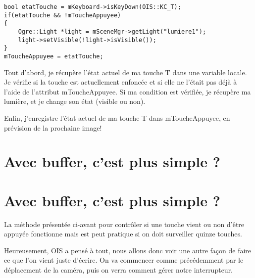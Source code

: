 \documentclass[10pt,a4paper]{report}
\begin{document}
\begin{lstlisting}[caption={Capture de l'\'etat ponctuel d'une touche}]
bool etatTouche = mKeyboard->isKeyDown(OIS::KC_T);
if(etatTouche && !mToucheAppuyee)
{
    Ogre::Light *light = mSceneMgr->getLight("lumiere1");
    light->setVisible(!light->isVisible());
}
mToucheAppuyee = etatTouche;
\end{lstlisting}





Tout d'abord, je r\'ecup\`ere l'\'etat actuel de ma touche T dans une variable locale. Je v\'erifie si la touche est actuellement enfonc\'ee et si elle ne l'\'etait pas d\'ej\`a \`a l'aide de l'attribut mToucheAppuyee. Si ma condition est v\'erifi\'ee, je r\'ecup\`ere ma lumi\`ere, et je change son \'etat (visible ou non).

Enfin, j'enregistre l'\'etat actuel de ma touche T dans mToucheAppuyee, en pr\'evision de la prochaine image!






\section{Avec buffer, c'est plus simple ?}




























\section{Avec buffer, c'est plus simple ?}

La m\'ethode pr\'esent\'ee ci-avant pour contrôler si une touche vient ou non d'\^etre appuy\'ee fonctionne mais est peut pratique si on doit surveiller quinze touches.

Heureusement, OIS a pens\'e \`a tout, nous allons donc voir une autre fa\c{c}on de faire ce que l'on vient juste d'\'ecrire. On va commencer comme pr\'ec\'edemment par le d\'eplacement de la cam\'era, puis on verra comment g\'erer notre interrupteur.
\end{document}
